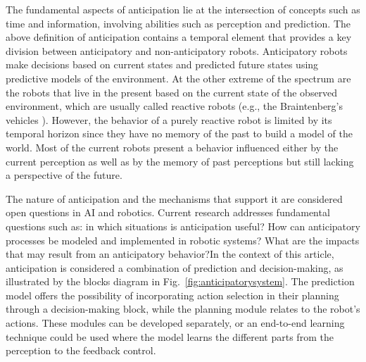 \documentclass[conference]{IEEEtran}
\begin{document}
The fundamental aspects of anticipation lie at the intersection of concepts such as time and information, involving abilities such as perception and prediction. The above definition of anticipation contains a temporal element that provides a key division between anticipatory and non-anticipatory robots. Anticipatory robots make decisions based on current states and predicted future states using predictive models of the environment. At the other extreme of the spectrum are the robots that live in the present based on the current state of the observed environment, which are usually called reactive robots (e.g., the Braintenberg’s vehicles \cite{Braitenberg1986}). However, the behavior of a purely reactive robot is limited by its temporal horizon since they have no memory of the past to build a model of the world. Most of the current robots present a behavior influenced either by the current perception as well as by the memory of past perceptions but still lacking a perspective of the future.


The nature of anticipation and the mechanisms that support it are considered open questions in AI and robotics.  Current research addresses fundamental questions such as: in which situations is anticipation useful? How can anticipatory processes be modeled and implemented in robotic systems? What are the impacts that may result from an anticipatory behavior?\fi In the context of this article, anticipation is considered a combination of prediction and decision-making, as illustrated by the blocks diagram in Fig.~\ref{fig:anticipatorysystem}. The prediction model offers the possibility of incorporating action selection in their planning through a decision-making block, while the planning module relates to the robot’s actions. These modules can be developed separately, or an end-to-end learning technique could be used where the model learns the different parts from the perception to the feedback control.
\end{document}
